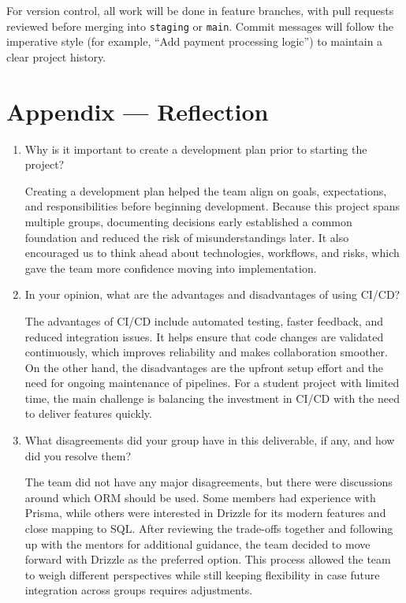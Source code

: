 \documentclass{article}
\begin{document}
For version control, all work will be done in feature branches, with pull requests reviewed before merging into \texttt{staging} or \texttt{main}. Commit messages will follow the imperative style (for example, “Add payment processing logic”) to maintain a clear project history.

\newpage{}

\section*{Appendix --- Reflection}

\begin{enumerate}
    \item Why is it important to create a development plan prior to starting the
    project?

    Creating a development plan helped the team align on goals, expectations, and responsibilities before beginning development. Because this project spans multiple groups, documenting decisions early established a common foundation and reduced the risk of misunderstandings later. It also encouraged us to think ahead about technologies, workflows, and risks, which gave the team more confidence moving into implementation.
    
    \item In your opinion, what are the advantages and disadvantages of using
    CI/CD?

    The advantages of CI/CD include automated testing, faster feedback, and reduced integration issues. It helps ensure that code changes are validated continuously, which improves reliability and makes collaboration smoother. On the other hand, the disadvantages are the upfront setup effort and the need for ongoing maintenance of pipelines. For a student project with limited time, the main challenge is balancing the investment in CI/CD with the need to deliver features quickly.
    
    \item What disagreements did your group have in this deliverable, if any,
    and how did you resolve them?
   
    The team did not have any major disagreements, but there were discussions around which ORM should be used. Some members had experience with Prisma, while others were interested in Drizzle for its modern features and close mapping to SQL. After reviewing the trade-offs together and following up with the mentors for additional guidance, the team decided to move forward with Drizzle as the preferred option. This process allowed the team to weigh different perspectives while still keeping flexibility in case future integration across groups requires adjustments.
\end{enumerate}
\end{document}
